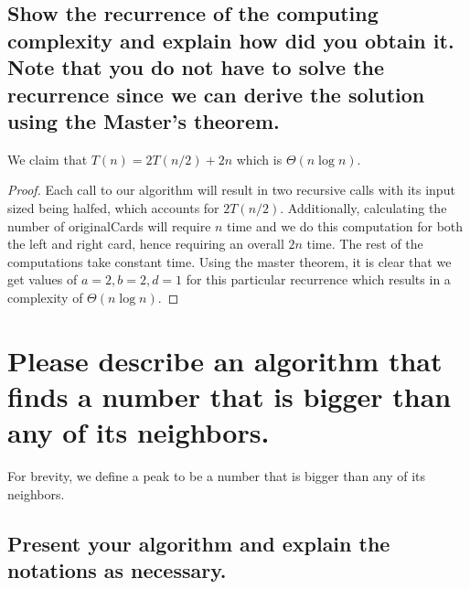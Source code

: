 \documentclass[11pt]{scrartcl}
\begin{document}
\subsection{
	Show the recurrence of the computing complexity and explain how did you obtain it.
	Note that you do not have to solve the recurrence since we can derive the solution
	using the Master’s theorem.
}
We claim that $T(n) = 2T(n/2) + 2n$ which is $\Theta(n\log n)$.
\begin{proof}
	Each call to our algorithm will result in two recursive calls
	with its input sized being halfed, which accounts for $2T(n/2)$. Additionally, calculating
	the number of originalCards will require $n$ time and we do this computation for both the left
	and right card, hence requiring an overall $2n$ time. The rest of the computations take constant time.
	Using the master theorem, it is clear that we get values of $a = 2, b = 2, d = 1$ for this particular
	recurrence which results in a complexity of $\Theta(n\log n)$.
\end{proof}



\section{Please describe an algorithm that finds a number that is
  bigger than any of its neighbors.}
  For brevity, we define a peak to be a number that is
  bigger than any of its neighbors.
\subsection{
	Present your algorithm and explain the notations as necessary.
}
\end{document}
